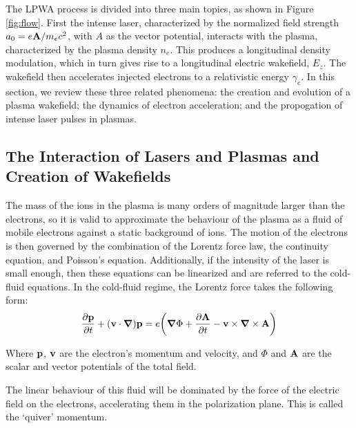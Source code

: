 \documentclass[12pt,letter]{article}
\begin{document}
The LPWA process is divided into three main topics, as shown in Figure
\ref{fig:flow}. First the intense laser, characterized
by the normalized field strength $a_0 = e\vb{A}/m_e c^2$, with $A$ as the vector
potential, interacts with the
plasma, characterized by the plasma density $n_e$. This produces a longitudinal
density modulation, which in turn gives rise to a longitudinal electric
wakefield, $E_z$. The wakefield then accelerates injected electrons to a relativistic energy
$\gamma_e$. In this section, we review these three related phenomena: 
the creation and evolution of a plasma wakefield; the dynamics of electron
acceleration; and the propogation of intense laser pulses in plasmas. 
\subsection{The Interaction of Lasers and Plasmas and Creation of Wakefields}
The mass of the ions in the plasma is many orders of magnitude larger than the
electrons, so it is valid to approximate the behaviour of the plasma as a fluid of
mobile electrons against a static background of ions. The motion of the
electrons is then governed by the
combination of the Lorentz force law, the continuity equation, and Poisson's
equation. Additionally, if the
intensity of the laser is small enough, then these equations can be
linearized and are referred to the cold-fluid
equations\cite{gorbunov1987excitation}.
In the cold-fluid regime, the Lorentz force takes the following form:
\begin{align}
    \label{eq:fullLPWA}
    \pdv{\vb{p}}{t} +(\vb{v} \cdot \grad)\vb{p} = e \qty( \grad \Phi
    +\pdv{\vb{A}}{t} - \vb{v}\times \grad \times \vb{A} )
\end{align}

Where $\vb{p}$, $\vb{v}$ are the electron's momentum and velocity, and $\Phi$
and $\vb{A}$ are the scalar and vector potentials of the total field.

The linear behaviour of this fluid will be dominated by the force of the
electric field on the electrons, accelerating them in the polarization
plane. This is called the `quiver' momentum. 
\end{document}
